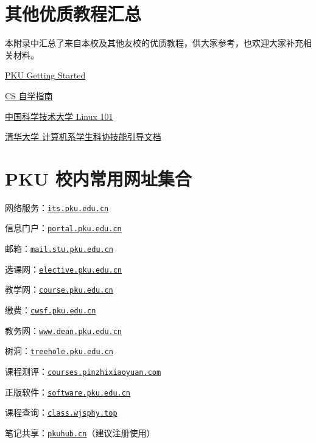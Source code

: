 \documentclass[../main]{subfiles}
\begin{document}
\chapter{其他优质教程汇总}

本附录中汇总了来自本校及其他友校的优质教程，供大家参考，也欢迎大家补充相关材料。

\href{https://missing.lcpu.dev}{PKU Getting Started}

\href{https://csdiy.wiki/}{CS 自学指南}

\href{https://101.lug.ustc.edu.cn/}{中国科学技术大学 Linux 101}

\href{https://docs.net9.org/}{清华大学 计算机系学生科协技能引导文档}

\chapter{PKU 校内常用网址集合}


网络服务：\href{its.pku.edu.cn}{\texttt{its.pku.edu.cn}}

信息门户：\href{portal.pku.edu.cn}{\texttt{portal.pku.edu.cn}}

邮箱：\href{mail.stu.pku.edu.cn}{\texttt{mail.stu.pku.edu.cn}}

选课网：\href{elective.pku.edu.cn}{\texttt{elective.pku.edu.cn}}

教学网：\href{course.pku.edu.cn}{\texttt{course.pku.edu.cn}}

缴费：\href{cwsf.pku.edu.cn}{\texttt{cwsf.pku.edu.cn}}

教务网：\href{www.dean.pku.edu.cn}{\texttt{www.dean.pku.edu.cn}}

树洞：\href{treehole.pku.edu.cn}{\texttt{treehole.pku.edu.cn}}

课程测评：\href{courses.pinzhixiaoyuan.com}{\texttt{courses.pinzhixiaoyuan.com}}

正版软件：\href{software.pku.edu.cn}{\texttt{software.pku.edu.cn}}

课程查询：\href{https://class.wjsphy.top/}{\texttt{class.wjsphy.top}}

笔记共享：\href{https://pkuhub.cn/}{\texttt{pkuhub.cn}}（建议注册使用）
\end{document}
